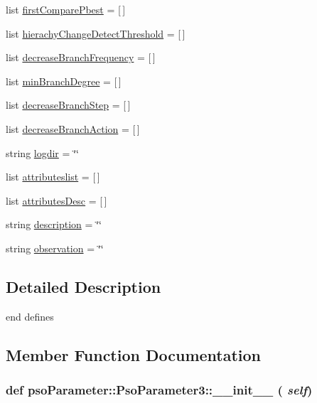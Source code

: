 \begin{CompactItemize}
list \hyperlink{classpsoParameter_1_1PsoParameter3_93a1fe869efd4c22670617d1ec936f8e}{firstComparePbest} = \mbox{[}$\,$\mbox{]}
\item 
list \hyperlink{classpsoParameter_1_1PsoParameter3_f1f420770f9df04e3cc8481a68d4c7d4}{hierachyChangeDetectThreshold} = \mbox{[}$\,$\mbox{]}
\item 
list \hyperlink{classpsoParameter_1_1PsoParameter3_3d94230d57d38c8adde10ad5d91dc652}{decreaseBranchFrequency} = \mbox{[}$\,$\mbox{]}
\item 
list \hyperlink{classpsoParameter_1_1PsoParameter3_55e6745f850a680de889e4c5f1f38e19}{minBranchDegree} = \mbox{[}$\,$\mbox{]}
\item 
list \hyperlink{classpsoParameter_1_1PsoParameter3_6274558274b0f35c8ec35176aae3f9f0}{decreaseBranchStep} = \mbox{[}$\,$\mbox{]}
\item 
list \hyperlink{classpsoParameter_1_1PsoParameter3_0a7569970a51b737207cc769a231a0d7}{decreaseBranchAction} = \mbox{[}$\,$\mbox{]}
\item 
string \hyperlink{classpsoParameter_1_1PsoParameter3_634a987d9dc1f0da298ba93de8f2ed2e}{logdir} = \char`\"{}\char`\"{}
\item 
list \hyperlink{classpsoParameter_1_1PsoParameter3_d0d518972cf744347f018357750f468e}{attributeslist} = \mbox{[}$\,$\mbox{]}
\item 
list \hyperlink{classpsoParameter_1_1PsoParameter3_b981340c8603b22af977b7e11b4269f0}{attributesDesc} = \mbox{[}$\,$\mbox{]}
\item 
string \hyperlink{classpsoParameter_1_1PsoParameter3_63fc1e3864370ea1345260defd882b28}{description} = \char`\"{}\char`\"{}
\item 
string \hyperlink{classpsoParameter_1_1PsoParameter3_5a09755eac058f60e03a8d5ceb167c18}{observation} = \char`\"{}\char`\"{}
\end{CompactItemize}


\subsection{Detailed Description}
end defines 

\subsection{Member Function Documentation}
\hypertarget{classpsoParameter_1_1PsoParameter3_4cb3d5081de0052e23fff2ef14c6b1ae}{
\subsubsection{\setlength{\rightskip}{0pt plus 5cm}def psoParameter::PsoParameter3::\_\-\_\-init\_\-\_\- ( {\em self})}}
\label{classpsoParameter_1_1PsoParameter3_4cb3d5081de0052e23fff2ef14c6b1ae}


